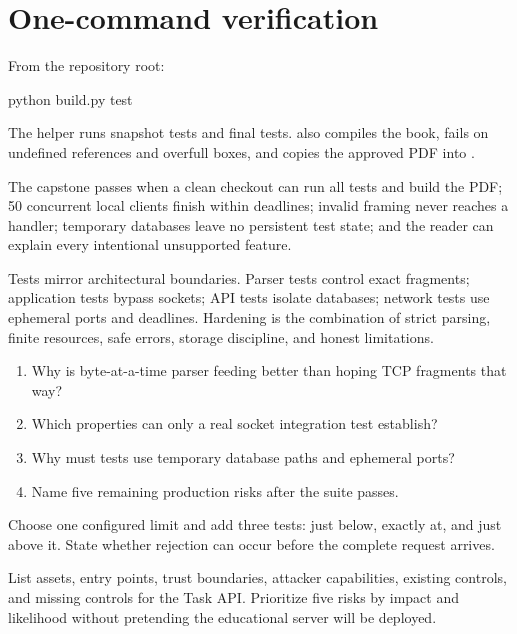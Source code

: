 \section{One-command verification}

From the repository root:

\begin{wiremessage}
python build.py test
\end{wiremessage}

The helper runs snapshot tests and final tests.  also
compiles the book, fails on undefined references and overfull boxes, and copies
the approved PDF into .

\begin{checkpoint}
The capstone passes when a clean checkout can run all tests and build the PDF;
50 concurrent local clients finish within deadlines; invalid framing never
reaches a handler; temporary databases leave no persistent test state; and the
reader can explain every intentional unsupported feature.
\end{checkpoint}

\summarytitle

Tests mirror architectural boundaries. Parser tests control exact fragments;
application tests bypass sockets; API tests isolate databases; network tests use
ephemeral ports and deadlines. Hardening is the combination of strict parsing,
finite resources, safe errors, storage discipline, and honest limitations.

\reviewtitle
\begin{enumerate}
  \item Why is byte-at-a-time parser feeding better than hoping TCP fragments that way?
  \item Which properties can only a real socket integration test establish?
  \item Why must tests use temporary database paths and ephemeral ports?
  \item Name five remaining production risks after the suite passes.
\end{enumerate}

\begin{exercise}
Choose one configured limit and add three tests: just below, exactly at, and just
above it. State whether rejection can occur before the complete request arrives.
\end{exercise}

\begin{exercise}
List assets, entry points, trust boundaries, attacker capabilities, existing
controls, and missing controls for the Task API. Prioritize five risks by impact
and likelihood without pretending the educational server will be deployed.
\end{exercise}

